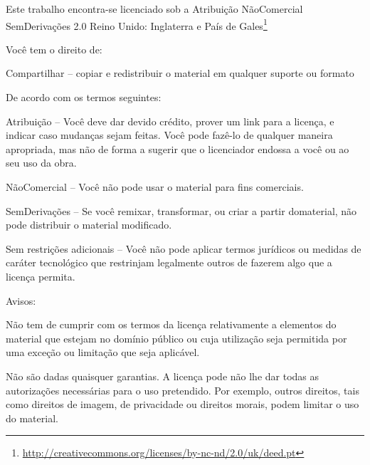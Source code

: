 
\cleartorecto
\thispagestyle{plain}

{\smaller\setlength{\parindent}{0pt}%
\raggedright\label{copyright-details}
\setlength{\parskip}{7pt}
{\centering

{\LARGE\ccbyncnd}

Este trabalho encontra-se licenciado sob a
Atribuição NãoComercial\\ SemDerivações 2.0 Reino Unido: Inglaterra e País de Gales\footnote{%
\href{http://creativecommons.org/licenses/by-nc-nd/2.0/uk/deed.pt}{http://creativecommons.org/licenses/by-nc-nd/2.0/uk/deed.pt}}

}

Você tem o direito de:

\begin{packeditemize}
\item Compartilhar -- copiar e redistribuir o material em qualquer suporte ou formato
\end{packeditemize}

De acordo com os termos seguintes:

\begin{packeditemize}
\item Atribuição -- Você deve dar devido crédito, prover um link para a licença, e indicar caso mudanças sejam feitas. Você pode fazê-lo de qualquer maneira apropriada, mas não de forma a sugerir que o licenciador endossa a você ou ao seu uso da obra.
\item NãoComercial -- Você não pode usar o material para fins comerciais.
\item SemDerivações -- Se você remixar, transformar, ou criar a partir domaterial, não pode distribuir o material modificado.
\end{packeditemize}

Sem restrições adicionais -- Você não pode aplicar termos jurídicos ou medidas de caráter tecnológico que restrinjam legalmente outros de fazerem algo que a licença permita.

Avisos:

\begin{packeditemize}
\item Não tem de cumprir com os termos da licença relativamente a elementos do material que estejam no domínio público ou cuja utilização seja permitida por uma exceção ou limitação que seja aplicável.
\item Não são dadas quaisquer garantias. A licença pode não lhe dar todas as autorizações necessárias para o uso pretendido. Por exemplo, outros direitos, tais como direitos de imagem, de privacidade ou direitos morais, podem limitar o uso do material.
\end{packeditemize}

}
